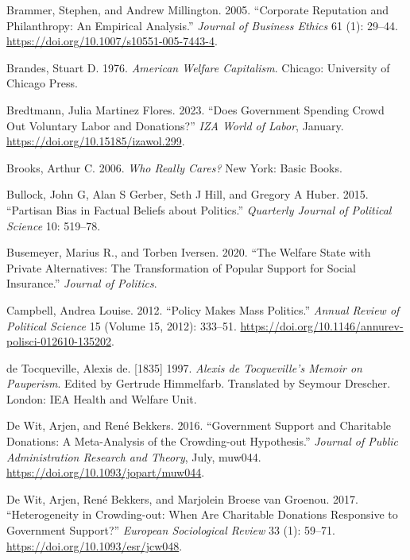 \documentclass[
  11pt,
  oneside]{article}
\newlength{\cslhangindent}
\newenvironment{CSLReferences}[2] %
 {\begin{list}{}{%
  \setlength{\itemindent}{0pt}
  \setlength{\leftmargin}{0pt}
  \setlength{\parsep}{0pt}
  \ifodd #1
   \setlength{\leftmargin}{\cslhangindent}
   \setlength{\itemindent}{-1\cslhangindent}
  \fi
  \setlength{\itemsep}{#2\baselineskip}}}
 {\end{list}}
\begin{document}
\begin{CSLReferences}{1}{0}
Brammer, Stephen, and Andrew Millington. 2005. {``Corporate {Reputation} and {Philanthropy}: {An Empirical Analysis}.''} \emph{Journal of Business Ethics} 61 (1): 29--44. \url{https://doi.org/10.1007/s10551-005-7443-4}.

Brandes, Stuart D. 1976. \emph{American {Welfare Capitalism}}. Chicago: University of Chicago Press.

Bredtmann, Julia Martinez Flores. 2023. {``Does Government Spending Crowd Out Voluntary Labor and Donations?''} \emph{IZA World of Labor}, January. \url{https://doi.org/10.15185/izawol.299}.

Brooks, Arthur C. 2006. \emph{Who {Really Cares}?} New York: Basic Books.

Bullock, John G, Alan S Gerber, Seth J Hill, and Gregory A Huber. 2015. {``Partisan {Bias} in {Factual Beliefs} about {Politics}.''} \emph{Quarterly Journal of Political Science} 10: 519--78.

Busemeyer, Marius R., and Torben Iversen. 2020. {``The {Welfare State} with {Private Alternatives}: The Transformation of Popular Support for Social Insurance.''} \emph{Journal of Politics}.

Campbell, Andrea Louise. 2012. {``Policy {Makes Mass Politics}.''} \emph{Annual Review of Political Science} 15 (Volume 15, 2012): 333--51. \url{https://doi.org/10.1146/annurev-polisci-012610-135202}.

de Tocqueville, Alexis de. {[}1835{]} 1997. \emph{Alexis de {Tocqueville}'s {Memoir} on Pauperism}. Edited by Gertrude Himmelfarb. Translated by Seymour Drescher. London: {IEA Health and Welfare Unit}.

De Wit, Arjen, and René Bekkers. 2016. {``Government {Support} and {Charitable Donations}: {A Meta-Analysis} of the {Crowding-out Hypothesis}.''} \emph{Journal of Public Administration Research and Theory}, July, muw044. \url{https://doi.org/10.1093/jopart/muw044}.

De Wit, Arjen, René Bekkers, and Marjolein Broese van Groenou. 2017. {``Heterogeneity in {Crowding-out}: {When Are Charitable Donations Responsive} to {Government Support}?''} \emph{European Sociological Review} 33 (1): 59--71. \url{https://doi.org/10.1093/esr/jcw048}.


\end{CSLReferences}
\end{document}
